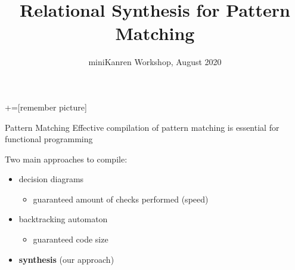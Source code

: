 \documentclass[aspectratio=169
  , xcolor={svgnames}
  , hyperref={ colorlinks,citecolor=Blue
             , linkcolor=DarkRed,urlcolor=DarkBlue}
  , russian
  ]{beamer}
\title{Relational Synthesis for Pattern Matching}
\date{miniKanren Workshop, August 2020}
\begin{document}
\maketitle

+=[remember picture] 

\everymath{\displaystyle}
\begin{frame}{Pattern Matching}
Effective compilation of pattern matching is essential for functional programming
\vspace{1cm}

Two main approaches to compile:
\begin{itemize}
\item decision diagrams
\begin{itemize}
\item guaranteed amount of checks performed (speed)
\end{itemize}
\item backtracking automaton
\begin{itemize}
\item guaranteed code size
\end{itemize}\pause
\item \textbf{synthesis} (our approach)
\end{itemize}
  \note{}
  
\end{frame}
\end{document}
